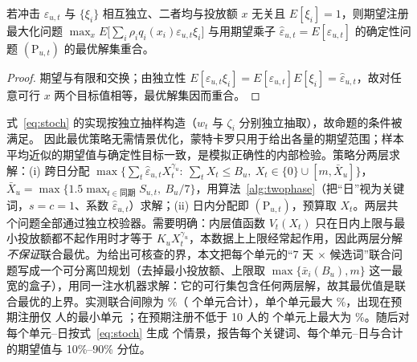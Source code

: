 \begin{proposition}[确定性等价]\label{prop:ce}
若冲击 $\varepsilon_{u,t}$ 与 $\{\xi_i\}$ 相互独立、二者均与投放额 $x$ 无关且 $E[\xi_i]=1$，则期望注册最大化问题 $\max_x E\bigl[\sum_i\rho_i q_i(x_i)\varepsilon_{u,t}\xi_i\bigr]$ 与用期望乘子 $\hat\varepsilon_{u,t}=E[\varepsilon_{u,t}]$ 的确定性问题 $(\mathrm P_{u,t})$ 的最优解集重合。
\end{proposition}
\begin{proof}
期望与有限和交换；由独立性 $E[\varepsilon_{u,t}\xi_i]=E[\varepsilon_{u,t}]E[\xi_i]=\hat\varepsilon_{u,t}$，故对任意可行 $x$ 两个目标值相等，最优解集因而重合。
\end{proof}
式~\eqref{eq:stoch} 的实现按独立抽样构造（$w_t$ 与 $\zeta_i$ 分别独立抽取），故命题的条件被满足。
因此最优策略无需情景优化，蒙特卡罗只用于给出各量的期望范围；样本平均近似的期望值与确定性目标一致，是模拟正确性的内部检验。策略分两层求解：(i) 跨日分配 $\max\{\sum_{t}\hat\varepsilon_{u,t}X_t^{\gamma_u}:\ \sum_tX_t\le B_u,\ X_t\in\{0\}\cup[m,\bar X_u]\}$，$\bar X_u=\max\{1.5\max_{t\in\text{同期}}S_{u,t},\ B_u/7\}$，用算法~\ref{alg:twophase}（把“日”视为关键词，$s=c=1$、系数 $\hat\varepsilon_{u,t}$）求解；(ii) 日内分配即 $(\mathrm P_{u,t})$，预算取 $X_t$。两层共 \valQfourAuditGroups{} 个问题全部通过独立校验器。需要明确：内层值函数 $V_t(X_t)$ 只在日内上限与最小投放额都不起作用时才等于 $K_uX_t^{\gamma_u}$，本数据上上限经常起作用，因此两层分解\emph{不保证}联合最优。为给出可核查的界，本文把每个单元的“7 天 $\times$ 候选词”联合问题写成一个可分离凹规划（去掉最小投放额、上限取 $\max\{\bar x_i(B_u),m\}$ 这一最宽的盒子），用同一注水机器求解：它的可行集包含任何两层解，故其最优值是联合最优的上界。实测联合间隙为 \valQfourJointGapPct\%（\valQfourJointUnits{} 个单元合计），单个单元最大 \valQfourJointMaxGapPct\%，出现在预期注册仅 \valQfourJointMaxGapUnitRegs{} 人的最小单元 \valQfourJointMaxGapUnit；在预期注册不低于 10 人的 \valQfourJointBigUnits{} 个单元上最大为 \valQfourJointMaxGapBigPct\%。随后对每个单元--日按式~\eqref{eq:stoch} 生成 \valQfourScenarios{} 个情景，报告每个关键词、每个单元--日与合计的期望值与 10\%--90\% 分位。

